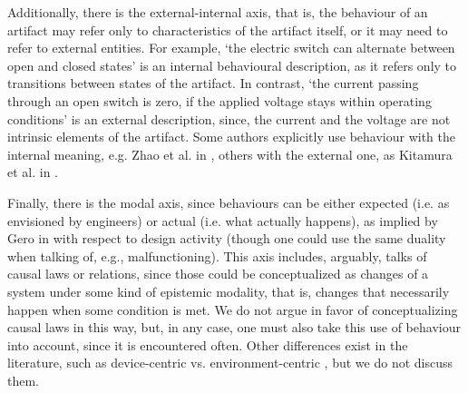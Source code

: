 \documentclass[sw]{iosart2x}
\newcommand{\TODO}[1]{{%
}}
\newcommand{\myComment}[1]{{\unskip \ignorespaces}}
\begin{document}
Additionally, there is the external-internal axis, that is, the behaviour of an artifact may refer only to characteristics of the artifact itself, or it may need to refer to \myComment{some} external entities.
For example, `the electric switch can alternate between open and closed states' is an internal behavioural description, as it refers only to transitions between states of the artifact.
In contrast, `the current passing through an open switch is zero, if the applied voltage stays within operating conditions' is an external description, since, the current and the voltage are not intrinsic elements of the artifact. %
Some authors explicitly use behaviour with the internal meaning, e.g. Zhao et al. in \cite{zhaoStateBehaviorFunction2019}, others with the external one, as Kitamura et al. in \cite{kitamuraOntologybasedSystematizationFunctional2004}.%

Finally, there is the modal axis, since \myComment{for \textcolor{blue}{(since? considering that?)}} behaviours can be \myComment{\textcolor{blue}{(either)}} either expected (i.e. as envisioned by engineers) or actual (i.e. what actually happens), as implied by Gero in \cite{geroSituatedFunctionBehaviour2004} with respect to design activity (though one could use the same duality when talking of, e.g., malfunctioning).
This axis includes, arguably, talks of causal laws or relations, since those could be conceptualized as changes of a system under some kind of epistemic modality, that is, changes that necessarily happen when some condition is met.
We do not argue in favor of conceptualizing causal laws in this way, but, in any case, one must also take this use of behaviour into account, since it is encountered often. %
Other differences exist in the literature, such as device-centric vs. environment-centric \cite{chandrasekaranFunctionDeviceRepresentation2000}, but we do not discuss them. 

\end{document}
